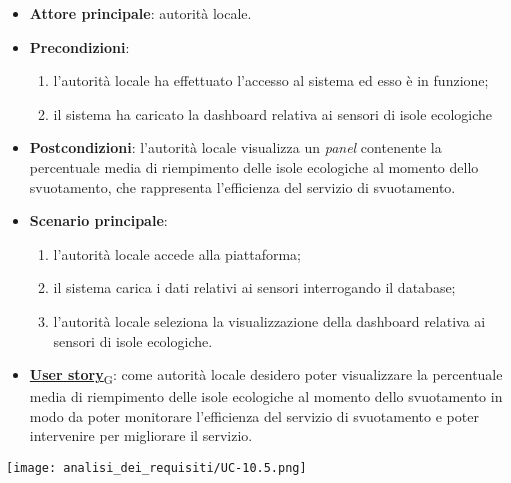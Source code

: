 \begin{itemize}
	\item \textbf{Attore principale}: autorità locale.
	\item \textbf{Precondizioni}:
	      \begin{enumerate}
		      \item l'autorità locale ha effettuato l'accesso al sistema ed esso è in funzione;
		      \item il sistema ha caricato la dashboard relativa ai sensori di isole ecologiche
	      \end{enumerate}
	\item \textbf{Postcondizioni}: l'autorità locale visualizza un \textit{panel} contenente la percentuale media di riempimento delle isole ecologiche al momento dello svuotamento,
	      che rappresenta l'efficienza del servizio di svuotamento.
	\item \textbf{Scenario principale}:
	      \begin{enumerate}
		      \item l'autorità locale accede alla piattaforma;
		      \item il sistema carica i dati relativi ai sensori interrogando il database;
		      \item l'autorità locale seleziona la visualizzazione della dashboard relativa ai sensori di isole ecologiche.
	      \end{enumerate}
	\item \href{https://7last.github.io/docs/rtb/documentazione-interna/glossario\#user-story}{\textbf{User story}\textsubscript{G}}:
	      come autorità locale desidero poter visualizzare la percentuale media di riempimento delle isole ecologiche al momento dello svuotamento in modo da poter monitorare
	      l'efficienza del servizio di svuotamento e poter intervenire per migliorare il servizio.
\end{itemize}
\begin{center}
	\texttt{[image: analisi\_dei\_requisiti/UC-10.5.png]}
\end{center}

